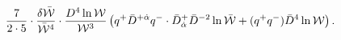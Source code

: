 \begin{equation}\label{s_term}
{7 \over 2\cdot 5}\cdot { \delta \bar{\cal W}\over \bar{\cal
W}^4}\cdot {D^4 \ln {\cal W}\over {\cal W}^3} \left(
q^{+}\bar{D}^{+\dot\alpha}q^{-}\cdot
\bar{D}^{+}_{\dot\alpha}\bar{D}^{-2}\ln \bar{\cal W} +
(q^{+}q^{-})\bar{D}^4 \ln {\cal W} \right).
\end{equation}

